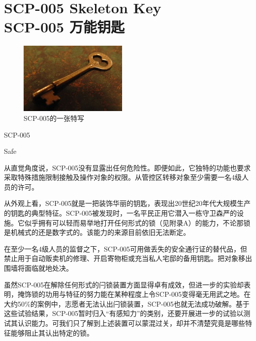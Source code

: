 \chapter[SCP-005 万能钥匙]{
	SCP-005 Skeleton Key\\
	SCP-005 万能钥匙
}

\label{chap:SCP-005}

\begin{figure}[H]
	\centering
	\includegraphics[width=0.5\linewidth]{images/SCP-005.jpg}
	\caption*{SCP-005的一张特写}
\end{figure}

SCP-005

Safe

从直觉角度说，SCP-005没有显露出任何危险性。即便如此，它独特的功能也要求采取特殊措施限制接触及操作对象的权限。从管控区转移对象至少需要一名4级人员的许可。

从外观上看，SCP-005就是一把装饰华丽的钥匙，表现出20世纪20年代大规模生产的钥匙的典型特征。SCP-005被发现时，一名平民正用它潜入一栋守卫森严的设施。它似乎拥有可以轻而易举地打开任何形式的锁（见附录A）的能力，不论那锁是机械式的还是数字式的。该能力的来源目前依旧无法断定。

在至少一名4级人员的监督之下，SCP-005可用做丢失的安全通行证的替代品，但禁止用于自动贩卖机的修理、开启寄物柜或充当私人宅邸的备用钥匙。把对象移出围墙将面临就地处决。

虽然SCP-005在解除任何形式的闩锁装置方面显得卓有成效，但进一步的实验却表明，掩饰锁的功用与特征的努力能在某种程度上令SCP-005变得毫无用武之地。在大约50\%的案例中，志愿者无法认出闩锁装置，SCP-005也就无法成功破解。基于这些试验结果，SCP-005暂时归入“有感知力”的类别，还要开展进一步的试验以测试其认识能力。可我们只了解到上述装置可以蒙混过关，却并不清楚究竟是哪些特征能够阻止其认出特定的锁。
